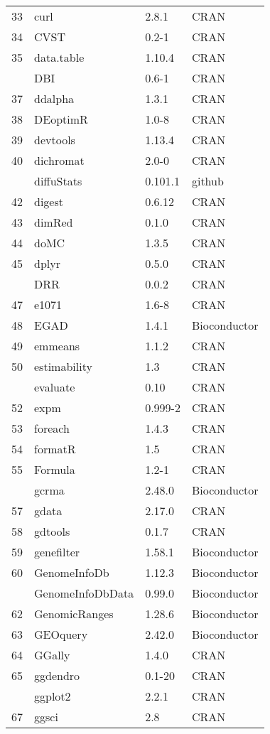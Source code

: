 \begin{longtable}{rlll}
33 & curl & 2.8.1 & CRAN\\
34 & CVST & 0.2-1 & CRAN\\
35 & data.table & 1.10.4 & CRAN\\
\addlinespace
36 & DBI & 0.6-1 & CRAN\\
37 & ddalpha & 1.3.1 & CRAN\\
38 & DEoptimR & 1.0-8 & CRAN\\
39 & devtools & 1.13.4 & CRAN\\
40 & dichromat & 2.0-0 & CRAN\\
\addlinespace
41 & diffuStats & 0.101.1 & github\\
42 & digest & 0.6.12 & CRAN\\
43 & dimRed & 0.1.0 & CRAN\\
44 & doMC & 1.3.5 & CRAN\\
45 & dplyr & 0.5.0 & CRAN\\
\addlinespace
46 & DRR & 0.0.2 & CRAN\\
47 & e1071 & 1.6-8 & CRAN\\
48 & EGAD & 1.4.1 & Bioconductor\\
49 & emmeans & 1.1.2 & CRAN\\
50 & estimability & 1.3 & CRAN\\
\addlinespace
51 & evaluate & 0.10 & CRAN\\
52 & expm & 0.999-2 & CRAN\\
53 & foreach & 1.4.3 & CRAN\\
54 & formatR & 1.5 & CRAN\\
55 & Formula & 1.2-1 & CRAN\\
\addlinespace
56 & gcrma & 2.48.0 & Bioconductor\\
57 & gdata & 2.17.0 & CRAN\\
58 & gdtools & 0.1.7 & CRAN\\
59 & genefilter & 1.58.1 & Bioconductor\\
60 & GenomeInfoDb & 1.12.3 & Bioconductor\\
\addlinespace
61 & GenomeInfoDbData & 0.99.0 & Bioconductor\\
62 & GenomicRanges & 1.28.6 & Bioconductor\\
63 & GEOquery & 2.42.0 & Bioconductor\\
64 & GGally & 1.4.0 & CRAN\\
65 & ggdendro & 0.1-20 & CRAN\\
\addlinespace
66 & ggplot2 & 2.2.1 & CRAN\\
67 & ggsci & 2.8 & CRAN\\

\end{longtable}
